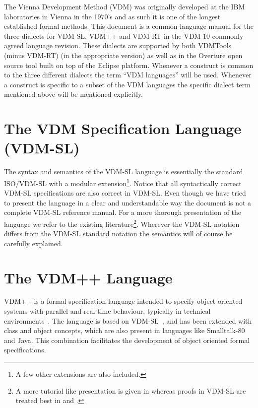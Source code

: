 \documentclass{overturerepchap}
\begin{document}
The Vienna Development Method (VDM)
\cite{Bjorner&78,Jones90a,Fitzgerald&08c} was originally developed at
the IBM laboratories in Vienna in the 1970's and as such it is one of
the longest established formal methods.
This document is a common language manual for the three dialects for
VDM-SL, VDM++ and VDM-RT in the VDM-10 commonly agreed language
revision. These dialects  are supported by both VDMTools (minus VDM-RT)
\cite{Fitzgerald&08a} (in the appropriate version) as well as in the
Overture open source tool \cite{Larsen&10a} built on top of the
Eclipse platform. Whenever a construct is common to the three
different dialects the term ``VDM languages'' will be used. Whenever a
construct is specific to a subset of the VDM languages the specific
dialect term mentioned above will be mentioned explicitly.

\section{The VDM Specification Language (VDM-SL)}

The syntax and semantics of the VDM-SL
language is essentially the standard ISO/VDM-SL \cite{ISOVDM96}
with a modular extension\footnote{A few other extensions are also included.}.
Notice that all syntactically correct VDM-SL specifications are also correct in
 VDM-SL.
Even though we have tried to present the language in a
clear and understandable way the document is not a complete VDM-SL
reference manual.
For a more thorough presentation of the language we refer to the
existing literature\footnote{A more tutorial like
presentation is given in \cite{Fitzgerald&98b,Fitzgerald&09} whereas proofs in VDM-SL
are treated best in \cite{Jones90a} and \cite{Bicarregui&94}.}.
Wherever the  VDM-SL notation differs from
the VDM-SL standard notation the semantics will of course be carefully
explained.

\section{The VDM++ Language}

VDM++ is a formal specification language intended to specify object
oriented systems with parallel and real-time behaviour, typically in
technical environments~\cite{Fitzgerald&05}.  The language is based on
VDM-SL~\cite{ISOVDM96}, and has been extended with class and object
concepts, which are also present in languages like Smalltalk-80 and
Java.  This combination facilitates the development of object oriented
formal specifications.
\end{document}
